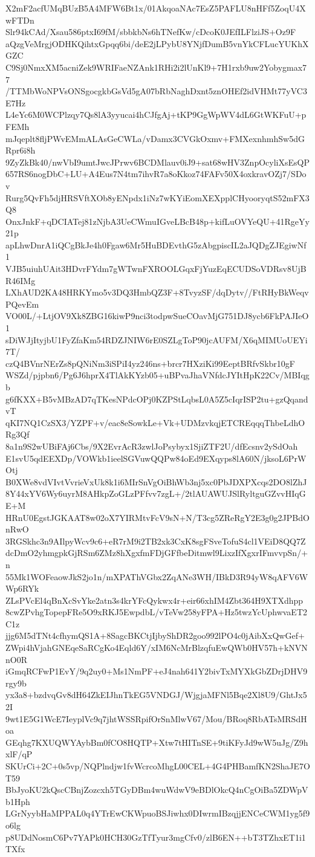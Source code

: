 X2mF2acfUMqBUzB5A4MFW6Bt1x/01AkqoaNAc7EsZ5PAFLU8nHFf5ZoqU4XwFTDn
Slr94kCAd/Xsau586ptxI69fM/sbbkbNs6hTNefKw/cDcoK0JEfILFlziJS+Oz9F
aQzgVeMrgjODHKQihtxGpqq6bi/deE2jLPybU8YNjfDumB5vnYkCFLucYUKhXGZC
C9Sj0NmxXM5acniZek9WRIFaeNZAnk1RHi2i2lUnKl9+7H1rxb9uw2Yobygmax77
/TTMbWoNPVsONSgocgkbGsVd5gA07bRbNaghDxnt5znOHEf2idVHMt77yVC3E7Hz
L4eYc6M0WCPlzqy7Qs8lA3yyucai4hCJfgAj+tKP9GgWpWV4dL6GtWKFuU+pFEMh
mJqeplt8fljPWvEMmALAsGeCWLa/vDamx3CVGkOxmv+FMXexnhmhSw5dGRpr6i8h
9ZyZkBk40/nwVbI9umtJwcJPrwv6BCDMlauv0iJ9+sat68wHV3ZnpOcyliXsEsQP
657RS6nogDbC+LU+A4Eus7N4tm7ihvR7a8oKkoz74FAFv50X4oxkravOZj7/SDov
Rurg5QvFh5djHRSVftXOb8yENpdx1iNz7wKYiEomXEXpplCHyooryqtS52mFX3Q8
OnxJnkF+qDCIATej81zNjbA3UeCWmuIGveLBcB48p+kifLuOVYeQU+41RgeYy21p
apLhwDnrA1iQCgBkJe4h0Fgaw6Mr5HuBDEvthG5zAbgpiscIL2aJQDgZJEgiwNf1
VJB5uiuhUAit3HDvrFYdm7gWTwnFXROOLGqxFjYuzEqECUDSoVDRsv8UjBR46IMg
LXhAUD2KA48HRKYmo5v3DQ3HmbQZ3F+8TvyzSF/dqDytv//FtRHyBkWeqvPQevEm
VO00L/+LtjOV9Xk8ZBG16kiwP9nci3todpwSueCOavMjG751DJ8ycb6FkPAJIeO1
sDiWJjItyjbU1FyZfaKm54RDZJNIW6rE0SZLgToP90jcAUFM/X6qMIMUoUEYi7T/
czQ4BVnrNErZs8pQNiNm3iSPiI4yz246ns+brcr7HXziKi99EeptBRfvSkbr10gF
WSZd/pjpbn6/Pg6J6hprX4TlAkKYzb05+uBPvaJhaVNfdcJYItHpK22Cv/MBIqgb
g6fKXX+B5vMBzAD7qTKesNPdcOPj0KZPStLqbsL0A5Z5cIqrISP2tu+gzQqandvT
qKI7NQ1CzSX3/YZPF+v/eac8eSowkLe+Vk+UDMzvkqjETCREqqqThbeLdhORg3Qf
8a1n9S2wUBiFAj6Cbs/9X2EvrAcR3zwlJoPsybyx1SjiZTF2U/dfEcsnv2ySdOah
E1svU5qdEEXDp/VOWkb1ieelSGVuwQQPw84oEd9EXqyps8lA60N/jksoL6PrWOtj
B0XWe8vdVIvtVvrieVxUk8k1i6MIrSnVgOiBhWb3nj5xc0PbJDXPXcqs2DO8lZhJ
8Y44xYV6Wy6uyrM8AHkpZoGLzPFfvv7zgL+/2tlAUAWUJSlRyltguGZvvHIqGE+M
HRnU0EgstJGKAAT8w02oX7YIRMtvFcV9sN+N/T3cg5ZReRgY2E3g0g2JPBdOnRwO
3RGSkhc3n9AIlpyWcv9c6+eR7rM9i2TB2xk3CxK8sgFSveTofuS4cl1VEiD8QQ7Z
dcDmO2yhmgpkGjRSm6ZMz8hXgxfmFDjGFfbeDitmwl9LixzIfXgxrIFmvvpSn/+n
55Mk1WOFeaowJkS2jo1n/mXPAThVGbx2ZqANe3WH/IBkD3R94yW8qAFV6WWp6RYk
ZLsPVcEl4qBnXcSvYke2atn3s4krYFcQykwx4r+eir66xhIM4Zbt364H9XTXdhpp
8cwZPvhgTopepFRe5O9xRKJ5EwpdbL/vTeVw258yFPA+Hz5twzYcUphwvaET2C1z
jjg6M5dTNt4cfhymQS1A+8SagcBKCtjIjbyShDR2goo992lPO4c0jAibXxQwGef+
ZWpi4hVjahGNEqeSaRCgKo4Eqld6Y/xIM6NcMrBlzqfuEwQWb0HV57h+kNVNnO0R
iGmqRCFwP1EvY/9q2uy0+Ms1NmPF+eJ4nah641Y2bivTxMYXkGbZDrjDHV9rgy9b
yx3a8+bzdvqGv8dH64ZkEIJhnTkEG5VNDGJ/WjgjaMFNl5Bqe2Xl8U9/GhtJx52I
9wt1E5G1WcE7IeyplVc9q7jhtWSSRpifOrSnMlwV67/Mou/BRoq8RbATsMRSdHoa
GEqhg7KXUQWYAybBm0fCO8HQTP+Xtw7tHITnSE+9tiKFyJd9wW5uJg/Z9hxlF/qP
SKUrCi+2C+0s5vp/NQPlndjw1fvWcrcoMhgL00CEL+4G4PHBamfKN2ShaJE7OT59
BbJyoKU2kQscCBnjZozcxh5TGyDBm4wuWdwV9eBDlOkcQ4nCgOiBa5ZDWpVb1Hph
LGrNyybHaMPPAL0q4YTrEwCKWpuoBSJiwhx0DIwrmIBzqjjENCeCWM1yg5f9o6lg
p8UDdNosmC6Pv7YAPk0HCH30GzTfTyur3mgCfv0/zlB6EN++bT3TZhxET1i1TXfx

